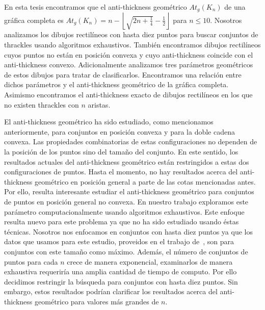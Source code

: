 En esta tesis encontramos que el anti-thickness geométrico $At_g(K_n)$ de una gráfica completa es
$At_g(K_n) = n - \left\lfloor\sqrt{2n + \frac{1}{4}}- \frac{1}{2}\right\rfloor$ para $n\leq 10$. Nosotros
analizamos los dibujos rectilíneos con hasta diez puntos para buscar conjuntos de thrackles usando
algoritmos exhaustivos. También encontramos dibujos rectilíneos cuyos puntos no están en posición convexa
y cuyo anti-thickness coincide con el anti-thickness convexo. Adicionalmente
analizamos tres parámetros geométricos de estos dibujos para tratar de clasificarlos. Encontramos una
relación entre dichos parámetros y el anti-thickness geométrico de la gráfica completa. Asimismo
encontramos el anti-thickness exacto de dibujos rectilíneos en los que no existen thrackles con $n$ aristas.

El anti-thickness geométrico ha sido estudiado, como mencionamos anteriormente, para conjuntos en posición
convexa y para la doble cadena convexa. Las propiedades combinatorias de estas configuraciones no dependen
de la posición de los puntos sino del tamaño del conjunto. En este sentido, los resultados actuales del
anti-thickness geométrico están restringidos a estas dos configuraciones de puntos. Hasta el momento, no
hay resultados acerca del anti-thickness geométrico en posición general a parte de las cotas mencionadas
antes. Por ello, resulta interesante estudiar el anti-thickness geométrico para conjuntos de puntos en
posición general no convexa. En nuestro trabajo exploramos este parámetro computacionalmente usando
algoritmos exhaustivos. Este enfoque resulta nuevo para este problema ya que no ha sido estudiado usando
éstas técnicas. Nosotros nos enfocamos en conjuntos con hasta diez puntos ya que los datos que usamos para
este estudio, proveidos en el trabajo de~\cite{Aichholzer2001}, son para conjuntos con este tamaño como
máximo. Además, el número de conjuntos de puntos para cada $n$ crece de manera exponencial, examinarlos de
manera exhaustiva requeriría una amplia cantidad de tiempo de computo. Por ello decidimos restringir la
búsqueda para conjuntos con hasta diez puntos. Sin embargo, estos resultados podrían clarificar los
resultados acerca del anti-thickness geométrico para valores más grandes de $n$.

